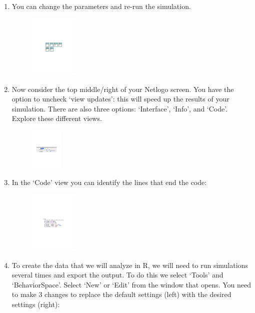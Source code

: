 \documentclass[11pt, oneside]{article}   	%
\begin{document}
\begin{enumerate}
\item You can change the parameters and re-run the simulation.

\begin{figure}[!ht]
\includegraphics[height=3cm]{parameters}
\end{figure}

\item Now consider the top middle/right of your Netlogo screen. You have the option to uncheck `view updates': this will speed up the results of your simulation. There are also three options: `Interface', `Info', and `Code'. Explore these different views.

\begin{figure}[!ht]
\includegraphics[height=2cm]{top}
\end{figure}

\item In the `Code' view you can identify the lines that end the code:

\begin{figure}[!ht]
\includegraphics[height=3cm]{code1}
\end{figure}

\item To create the data that we will analyze in R, we will need to run simulations several times and export the output. To do this we select `Tools' and `BehaviorSpace'. Select `New' or `Edit' from the window that opens. You need to make 3 changes to replace the default settings (left) with the desired settings (right):


\end{enumerate}
\end{document}
